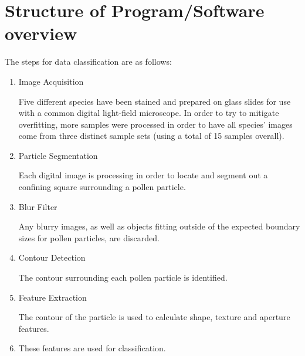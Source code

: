\section{Structure of Program/Software overview} 

The steps for data classification are as follows:
\begin{enumerate}
\item Image Acquisition

Five different species have been stained and prepared on glass slides for use with a common digital light-field microscope.  In order to try to mitigate  overfitting, more samples were processed in order to have all species' images come from three distinct sample sets (using a total of 15 samples overall). 

\item Particle Segmentation

Each digital image is processing in order to locate and segment out a confining square surrounding a pollen particle.

\item Blur Filter

Any blurry images, as well as objects fitting outside of the expected boundary sizes for pollen particles, are discarded.

\item Contour Detection

The contour surrounding each pollen particle is identified.

\item Feature Extraction

The contour of the particle is used to calculate shape, texture and aperture features.

\item These features are used for classification.

\end{enumerate}
    
    
    
    
    
    
    
    
    
    
    
    
    
    
    
  
  
  
  